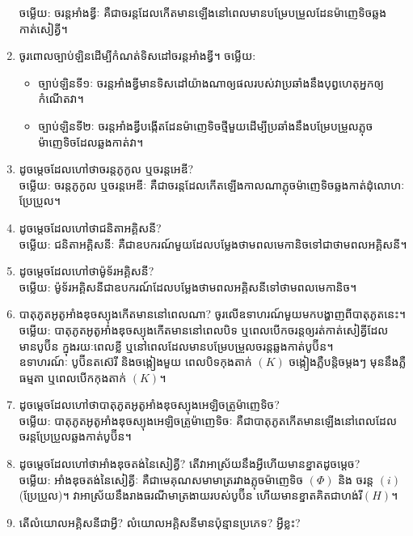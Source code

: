 \documentclass{officialexam}
\begin{document}
\begin{enumerate}[m]
		{\color{red}\sffamily ចម្លើយ}: ចរន្តអាំងឌ្វីៈ គឺជាចរន្តដែលកើតមានឡើងនៅពេលមានបម្រែបម្រួលដែនម៉ាញេទិចឆ្លងកាត់សៀគ្វី។
		\item ចូរពោលច្បាប់ឡិនដើម្បីកំណត់ទិសដៅចរន្តអាំងឌ្វី។ {\color{red}\sffamily ចម្លើយ}:
		\begin{itemize}
			\item ច្បាប់ឡិនទី១ៈ ចរន្តអាំងឌ្វីមានទិសដៅយ៉ាងណាឲ្យផលរបស់វាប្រឆាំងនឹងបុព្វហេតុអ្នកឲ្យកំណើតវា។
			\item ច្បាប់ឡិនទី២ៈ ចរន្តអាំងឌ្វីបង្កើតដែនម៉ាញេទិចថ្មីមួយដើម្បីប្រឆាំងនឹងបម្រែបម្រួលភ្លុចម៉ាញេទិចដែលឆ្លងកាត់វា។
		\end{itemize}
		\item ដូចម្តេចដែលហៅថាចរន្តភូកូល ឬចរន្តអេឌី?\\
		{\color{red}\sffamily ចម្លើយ}: ចរន្តភូកូល ឬចរន្តអេឌីៈ គឺជាចរន្តដែលកើតឡើងកាលណាភ្លុចម៉ាញេទិចឆ្លងកាត់ដុំលោហៈប្រែប្រួល។
		\item ដូចម្តេចដែលហៅថាជនិតាអគ្គិសនី?\\
		{\color{red}\sffamily ចម្លើយ}: ជនិតាអគ្គិសនីៈ គឺជាឧបករណ៍មួយដែលបម្លែងថាមពលមេកានិចទៅជាថាមពលអគ្គិសនី។
		\item ដូចម្តេចដែលហៅថាម៉ូទ័រអគ្គិសនី?\\
		{\color{red}\sffamily ចម្លើយ}: ម៉ូទ័រអគ្គិសនីជាឧបករណ៍ដែលបម្លែងថាមពលអគ្គិសនីទៅថាមពលមេកានិច។
		\item បាតុភូតអូតូអាំងឌុចស្យុងកើតមាននៅពេលណា? ចូរលើឧទាហរណ៍មួយមកបង្ហាញពីបាតុភូតនេះ។\\
		{\color{red}\sffamily ចម្លើយ}: បាតុភូតអូតូអាំងឌុចស្យុងកើតមាននៅពេលបិទ ឬពេលបើកចរន្តឲ្យរត់កាត់សៀគ្វីដែលមានបូប៊ីន ក្នុងរយៈពេលខ្លី ឬនៅពេលដែលមានបម្រែបម្រួលចរន្តឆ្លងកាត់បូប៊ីន។\\
		ឧទាហរណ៍ៈ បូប៊ីនតស៊េរី និងចង្កៀងមួយ ពេលបិទកុងតាក់ $\left(K\right)$ ចង្កៀងភ្លឺបន្តិចម្តងៗ មុននឹងភ្លឺធម្មតា ឬពេលបើកកុងតាក់ $\left(K\right)$។
		\item ដូចម្តេចដែលហៅថាបាតុភូតអូតូអាំងឌុចស្យុងអេឡិចត្រូម៉ាញេទិច?\\
		{\color{red}\sffamily ចម្លើយ}: បាតុភូតអូតូអាំងឌុចស្យុងអេឡិចត្រូម៉ាញេទិចៈ គឺជាបាតុភូតកើតមានឡើងនៅពេលដែលចរន្តប្រែប្រួលឆ្លងកាត់បូប៊ីន។
		\item ដូចម្តេចដែលហៅថាអាំងឌុចតង់នៃសៀគ្វី? តើវាអាស្រ័យនឹងអ្វីហើយមានខ្នាតដូចម្តេច?\\
		{\color{red}\sffamily ចម្លើយ}: អាំងឌុចតង់នៃសៀគ្វីៈ គឺជាមេគុណសមាមាត្ររវាងភ្លុចម៉ាញេទិច $\left(\Phi\right)$ និង ចរន្ត $\left(i\right)$(ប្រែប្រួល)។ វាអាស្រ័យនឹងរាងធរណីមាត្រងាយរបស់បូប៊ីន ហើយមានខ្នាតគិតជាហង់រី$\left(H\right)$។
		\item តើលំយោលអគ្គិសនីជាអ្វី? លំយោលអគ្គិសនីមានប៉ុន្មានប្រភេទ? អ្វីខ្លះ?\\

\end{enumerate}
\end{document}
